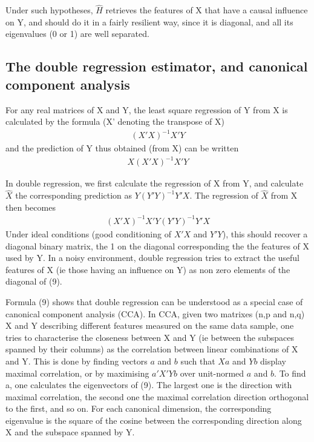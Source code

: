 \documentclass{article}
\begin{document}
Under such hypotheses, $\hat H$ retrieves the features of X that have a causal influence on Y, and should do it in a fairly resilient way, since it is diagonal, and all its eigenvalues (0 or 1) are well separated.

\subsection{The double regression estimator, and canonical component analysis}

For any real matrices of X and Y, the least square regression of Y from X is calculated by the formula (X' denoting the transpose of X)
\begin{equation}
\begin{aligned}
(X'X)^{-1} X'Y
\end{aligned}
\end{equation}
and the prediction of Y thus obtained (from X) can be written
\begin{equation}
\begin{aligned}
X(X'X)^{-1} X'Y
\end{aligned}
\end{equation}
 
In double regression, we first calculate the regression of X from Y, and calculate $\hat X$ the corresponding prediction as $Y(Y'Y)^{-1} Y'X$. The regression of $\hat X$ from X then becomes
\begin{equation}
\begin{aligned}
(X'X)^{-1} X'Y(Y'Y)^{-1} Y'X
\end{aligned}
\end{equation}
Under ideal conditions (good conditioning of $X'X$ and $Y'Y$), this should recover a diagonal binary matrix, the 1 on the diagonal corresponding the the features of X used by Y. In a noisy environment, double regression tries to extract the useful features of X (ie those having an influence on Y) as non zero elements of the diagonal of (9).

Formula (9) shows that double regression can be understood as a special case of canonical component analysis (CCA). In CCA, given two matrixes (n,p and n,q) X and Y describing different features measured on the same data sample, one tries to characterise the closeness between X and Y (ie between the subspaces spanned by their columns) as the correlation between linear combinations of X and Y. This is done by finding vectors $a$ and $b$ such that $Xa$ and $Yb$ display maximal correlation, or by maximising $a'X'Yb$ over unit-normed $a$ and $b$. To find a, one calculates the eigenvectors of (9). The largest one is the direction with maximal correlation, the second one the maximal correlation direction orthogonal to the first, and so on. For each canonical dimension, the corresponding eigenvalue is the square of the cosine between the corresponding direction along X and the subspace spanned by Y.  
\end{document}
